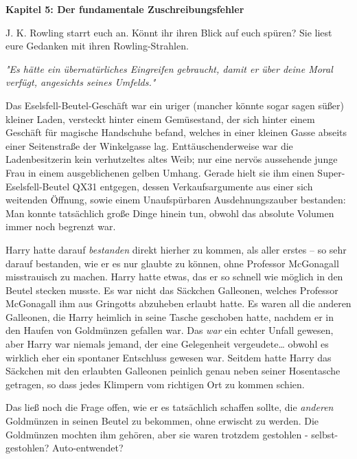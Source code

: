

\hypertarget{der-fundamentale-zuschreibungsfehler}{%

\textbf{Kapitel 5: Der fundamentale Zuschreibungsfehler}

J. K. Rowling starrt euch an. Könnt ihr ihren Blick auf euch spüren? Sie liest eure Gedanken mit ihren Rowling-Strahlen.

\later

\emph{"Es hätte ein übernatürliches Eingreifen gebraucht, damit er über deine Moral verfügt, angesichts seines Umfelds."}

\later

Das Eselsfell-Beutel-Geschäft war ein uriger (mancher könnte sogar sagen süßer) kleiner Laden, versteckt hinter einem Gemüsestand, der sich hinter einem Geschäft für magische Handschuhe befand, welches in einer kleinen Gasse abseits einer Seitenstraße der Winkelgasse lag. Enttäuschenderweise war die Ladenbesitzerin kein verhutzeltes altes Weib; nur eine nervös aussehende junge Frau in einem ausgeblichenen gelben Umhang. Gerade hielt sie ihm einen Super-Eselsfell-Beutel QX31 entgegen, dessen Verkaufsargumente aus einer sich weitenden Öffnung, sowie einem Unaufspürbaren Ausdehnungszauber bestanden: Man konnte tatsächlich große Dinge hinein tun, obwohl das absolute Volumen immer noch begrenzt war.

Harry hatte darauf \emph{bestanden} direkt hierher zu kommen, als aller erstes -- so sehr darauf bestanden, wie er es nur glaubte zu können, ohne Professor McGonagall misstrauisch zu machen. Harry hatte etwas, das er so schnell wie möglich in den Beutel stecken musste. Es war nicht das Säckchen Galleonen, welches Professor McGonagall ihm aus Gringotts abzuheben erlaubt hatte. Es waren all die anderen Galleonen, die Harry heimlich in seine Tasche geschoben hatte, nachdem er in den Haufen von Goldmünzen gefallen war. Das \emph{war} ein echter Unfall gewesen, aber Harry war niemals jemand, der eine Gelegenheit vergeudete… obwohl es wirklich eher ein spontaner Entschluss gewesen war. Seitdem hatte Harry das Säckchen mit den erlaubten Galleonen peinlich genau neben seiner Hosentasche getragen, so dass jedes Klimpern vom richtigen Ort zu kommen schien.

Das ließ noch die Frage offen, wie er es tatsächlich schaffen sollte, die \emph{anderen} Goldmünzen in seinen Beutel zu bekommen, ohne erwischt zu werden. Die Goldmünzen mochten ihm gehören, aber sie waren trotzdem gestohlen - selbst-gestohlen? Auto-entwendet?

}
